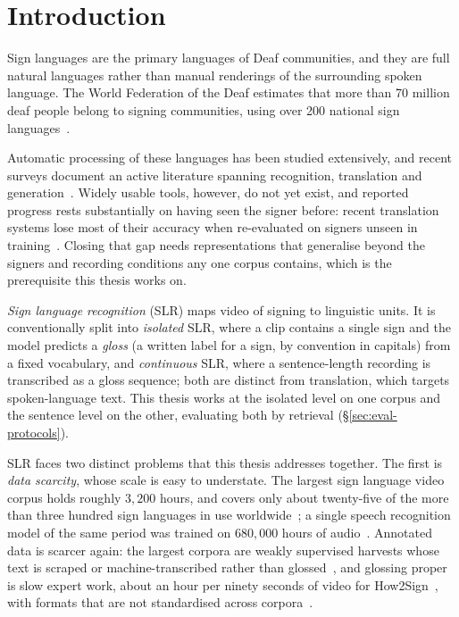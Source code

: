 \chapter{Introduction}
Sign languages are the primary languages of Deaf communities, and they
are full natural languages rather than manual renderings of the
surrounding spoken language. The World Federation of the Deaf estimates
that more than 70 million deaf people belong to signing communities,
using over 200 national sign languages~\cite{wfd2026faq}.

Automatic processing of these languages has been studied extensively, and
recent surveys document an active literature spanning recognition,
translation and
generation~\cite{bragg2019sign, koller2020quantitative,
nunezmarcos2023survey, decoster2024machine}. Widely usable tools,
however, do not yet exist, and reported progress rests substantially on
having seen the signer before: recent translation systems lose most of
their accuracy when re-evaluated on signers unseen in
training~\cite{artiagaRethinkingSignLanguage2025}. Closing that gap needs
representations that generalise beyond the signers and recording
conditions any one corpus contains, which is the prerequisite this thesis
works on.

\emph{Sign language recognition} (SLR) maps video of signing to
linguistic units. It is conventionally split into \emph{isolated} SLR,
where a clip contains a single sign and the model predicts a \emph{gloss}
(a written label for a sign, by convention in capitals) from a fixed
vocabulary, and \emph{continuous} SLR, where a sentence-length recording
is transcribed as a gloss sequence; both are distinct from translation,
which targets spoken-language text. This thesis works at the isolated
level on one corpus and the sentence level on the other, evaluating both
by retrieval (\S\ref{sec:eval-protocols}).

SLR faces two distinct problems that this
thesis addresses together.
The first is \emph{data scarcity}, whose scale is easy to understate. The
largest sign language video corpus holds roughly $3{,}200$ hours, and
covers only about twenty-five of the more than three hundred sign
languages in use worldwide~\cite{tanzerYouTubeSL25}; a single speech
recognition model of the same period was trained on $680{,}000$ hours of
audio~\cite{radfordRobustSpeechRecognition2022}. Annotated data is
scarcer again: the largest corpora are weakly supervised harvests whose
text is scraped or machine-transcribed rather than
glossed~\cite{tanzerYouTubeSL25, liUniSignUnifiedSign2025}, and glossing
proper is slow expert work, about an hour per ninety seconds of video for
How2Sign~\cite{duarteHow2Sign2021}, with formats that are not
standardised across
corpora~\cite{desistoChallengesSignLanguage2022, DataProblem}. 

